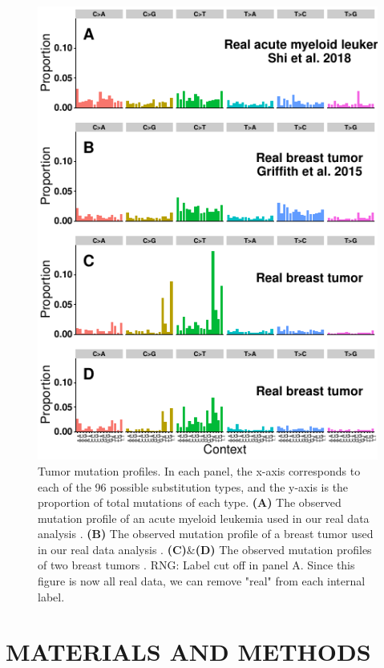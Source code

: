 \documentclass[a4,center,fleqn]{NAR}
\newcommand{\rngcomment}[1]{{\color{red}RNG: #1}}
\begin{document}
\begin{figure}
  \begin{center}
  \includegraphics{figures/real_signatures_only.pdf}
  \end{center}
  \caption{Tumor mutation profiles.
  In each panel, the x-axis corresponds to each of the 96 possible substitution types, and the y-axis is the proportion of total mutations of each type.
  \textbf{(A)} The observed mutation profile of an acute myeloid leukemia used in our real data analysis \cite{Griffith2015}.
  \textbf{(B)} The observed mutation profile of a breast tumor used in our real data analysis \cite{Shi2018}.
  \textbf{(C)}\&\textbf{(D)} The observed mutation profiles of two breast tumors \cite{Alexandrov2019}.
  \rngcomment{Label cut off in panel A. Since this figure is now all real data, we can remove "real" from each internal label.}
   }
  \label{NAR-realsigfig}
 \end{figure}

\section{MATERIALS AND METHODS}
\end{document}
